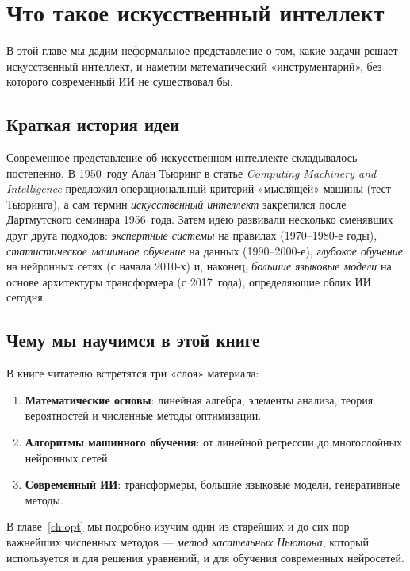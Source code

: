 \chapter{Что такое искусственный интеллект}
\label{ch:intro}

В этой главе мы дадим неформальное представление о том, какие задачи
решает искусственный интеллект, и наметим математический «инструментарий»,
без которого современный ИИ не существовал бы.

\section{Краткая история идеи}

Современное представление об искусственном интеллекте складывалось
постепенно. В 1950~году Алан Тьюринг в статье \emph{Computing Machinery
and Intelligence} предложил операциональный критерий «мыслящей» машины
(тест Тьюринга), а сам термин \emph{искусственный интеллект} закрепился
после Дартмутского семинара 1956~года. Затем идею развивали несколько
сменявших друг друга подходов: \emph{экспертные системы} на правилах
(1970--1980-е годы), \emph{статистическое машинное обучение} на данных
(1990--2000-е), \emph{глубокое обучение} на нейронных сетях (с начала
2010-х) и, наконец, \emph{большие языковые модели} на основе архитектуры
трансформера (с 2017~года), определяющие облик ИИ сегодня.

\section{Чему мы научимся в этой книге}

В книге читателю встретятся три «слоя» материала:
\begin{enumerate}
  \item \textbf{Математические основы}: линейная алгебра, элементы
        анализа, теория вероятностей и численные методы оптимизации.
  \item \textbf{Алгоритмы машинного обучения}: от линейной регрессии
        до многослойных нейронных сетей.
  \item \textbf{Современный ИИ}: трансформеры, большие языковые модели,
        генеративные методы.
\end{enumerate}

В главе~\ref{ch:opt} мы подробно изучим один из старейших и до сих пор
важнейших численных методов — \emph{метод касательных Ньютона}, который
используется и для решения уравнений, и для обучения современных
нейросетей.
